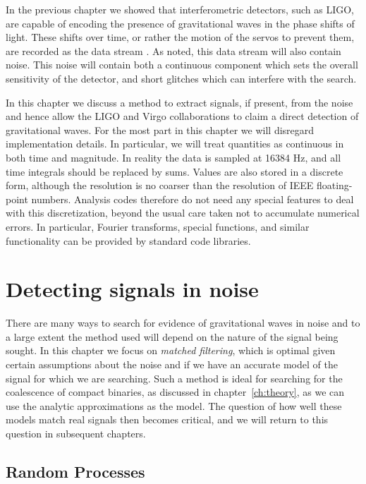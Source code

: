 In the previous chapter we showed that interferometric detectors, such
as LIGO, are capable of encoding the presence of gravitational waves
in the phase shifts of light.  These shifts over time, or rather the
motion of the servos to prevent them, are recorded as the data stream
\darmerr.  As noted, this data stream will also contain noise.  This
noise will contain both a continuous component which sets the overall
sensitivity of the detector, and short glitches which can interfere
with the search.

In this chapter we discuss a method to extract signals, if present,
from the noise and hence allow the LIGO and Virgo collaborations to
claim a direct detection of gravitational waves.  For the most part in
this chapter we will disregard implementation details.  In particular,
we will treat quantities as continuous in both time and magnitude.  In
reality the data is sampled at 16384 Hz, and all time integrals
should be replaced by sums.  Values are also stored in a discrete
form, although the resolution is no coarser than the resolution of
IEEE floating-point numbers.  Analysis codes therefore do not need any
special features to deal with this discretization, beyond the usual
care taken not to accumulate numerical errors.  In particular, Fourier
transforms, special functions, and similar functionality can be
provided by standard code libraries.



\section{Detecting signals in noise}
\label{sec:ihope_match_filter}

There are many ways to search for evidence of gravitational waves in
noise and to a large extent the method used will depend on the nature
of the signal being sought.  In this chapter we focus on \emph{matched
filtering}, which is optimal given certain assumptions about the noise
and if we have an accurate model of the signal for which we are
searching.  Such a method is ideal for searching for the coalescence
of compact binaries, as discussed in chapter~\ref{ch:theory}, as we
can use the analytic approximations as the model.  The question of how
well these models match real signals then becomes critical, and 
we will return to this question in subsequent chapters.

\subsection{Random Processes}
\label{ssec:random_processes}

